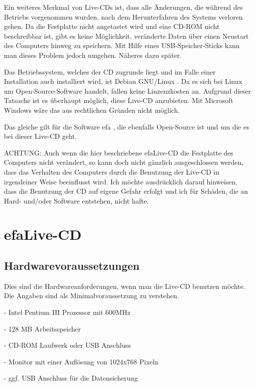 \documentclass[a4paper,12pt,twoside]{article}
\begin{document}
Ein weiteres Merkmal von Live-CDs ist, dass alle Änderungen, die während
des Betriebs vorgenommen wurden, nach dem Herunterfahren des Systems
verloren gehen. Da die Festplatte nicht angetastet wird und eine CD-ROM
nicht beschreibbar ist, gibt es keine Möglichkeit, veränderte Daten
über einen Neustart des Computers hinweg zu speichern. Mit Hilfe eines
USB-Speicher-Sticks kann man dieses Problem jedoch umgehen. Näheres
dazu später.

Das Betriebssystem, welches der CD zugrunde liegt und im Falle einer
Installation auch installiert wird, ist Debian GNU/Linux \cite{DEB1}.
Da es sich bei Linux um Open-Source-Software handelt, fallen keine
Linzenzkosten an. Aufgrund dieser Tatsache ist es überhaupt möglich,
diese Live-CD anzubieten. Mit Microsoft Windows wäre das aus
rechtlichen Gründen nicht möglich.

Das gleiche gilt für die Software efa \cite{EFA1}, die ebenfalls
Open-Source ist und um die es bei dieser Live-CD geht.

\bigskip
ACHTUNG: Auch wenn die hier beschriebene efaLive-CD die Festplatte des
Computers nicht verändert, so kann doch nicht gänzlich ausgeschlossen
werden, dass das Verhalten des Computers durch die Benutzung der
Live-CD in irgendeiner Weise beeinflusst wird. Ich möchte ausdrücklich
darauf hinweisen, dass die Benutzung der CD auf eigene Gefahr erfolgt
und ich für Schäden, die an Hard- und/oder Software entstehen, nicht
hafte.


\bigskip

\section[efaLive{}-CD]{efaLive{}-CD}
\subsection[Hardwarevoraussetzungen]{Hardwarevoraussetzungen}
Dies sind die Hardwareanforderungen, wenn man die Live-CD benutzen
möchte. Die Angaben sind als Minimalvoraussetzung zu verstehen.


\bigskip

{}- Intel Pentium III Prozessor mit 600MHz

{}- 128 MB Arbeitsspeicher

{}- CD-ROM Laufwerk oder USB Anschluss

{}- Monitor mit einer Auflösung von 1024x768 Pixeln

{}- ggf. USB Anschluss für die Datensicherung
\end{document}
